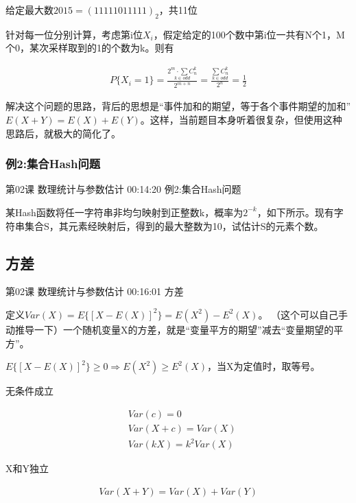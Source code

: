 \documentclass[UTF8]{ctexbook}
\begin{document}
给定最大数$2015=(11111011111)_{2}$，共11位

针对每一位分别计算，考虑第i位$X_{i}$，假定给定的100个数中第i位一共有N个1，M个0，某次采样取到的1的个数为k。则有

\begin{equation}
\begin{aligned}
P\{X_{i}=1\}=\frac{\underset{k \in odd}{2^{m} \cdot \sum C_{n}^{k}}}{2^{m+n}}
=\frac{\underset{k \in odd}{\sum C_{n}^{k}}}{2^{n}}
=\frac{1}{2}
\end{aligned}
\end{equation}

解决这个问题的思路，背后的思想是“事件加和的期望，等于各个事件期望的加和”$E(X+Y)=E(X)+E(Y)$。这样，当前题目本身听着很复杂，但使用这种思路后，就极大的简化了。

\subsubsection{例2:集合Hash问题}

第02课 数理统计与参数估计 00:14:20 例2:集合Hash问题

某Hash函数将任一字符串非均匀映射到正整数k，概率为$2^{-k}$，如下所示。现有字符串集合S，其元素经映射后，得到的最大整数为10，试估计S的元素个数。

\subsection{方差}

第02课 数理统计与参数估计 00:16:01 方差

定义$Var(X)=E\{  [X-E(X)]^{2} \}=E(X^{2})-E^{2}(X)$。 （这个可以自己手动推导一下）一个随机变量X的方差，就是“变量平方的期望”减去“变量期望的平方”。

$E\{  [X-E(X)]^{2} \} \geq 0 \Rightarrow E(X^{2}) \geq E^{2}(X)$，当X为定值时，取等号。

无条件成立

\begin{equation}
\begin{aligned}
&Var(c)=0 \\
&Var(X+c)=Var(X)\\
&Var(kX)=k^{2}Var(X)
\end{aligned}
\end{equation}

X和Y独立

\begin{equation}
\begin{aligned}
Var(X+Y)=Var(X)+Var(Y)
\end{aligned}
\end{equation}
\end{document}
